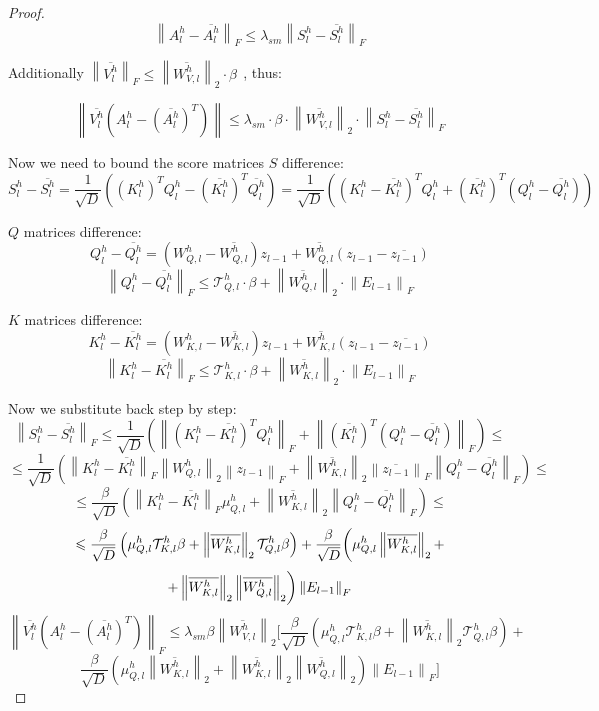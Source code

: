 \documentclass[a4paper,14pt]{extarticle}
\begin{document}
\begin{proof}
        $$\left\|A_l^h - \overline{A_l^h}\right\|_F \leqslant \lambda_{sm} \left\|S_l^h - \overline{S_l^h}\right\|_F $$

        Additionally $\left\|\overline{V_l^h}\right\|_F \leqslant \left\|\overline{W_{V,l}^h}\right\|_2 \cdot \beta ~~$, thus:

        $$\left\|\overline{V_l^h} (A_l^h - (\overline{A_l^h})^T)\right\|\leqslant \lambda_{sm} \cdot \beta \cdot\left\|\overline{W_{V,l}^h}\right\|_2 \cdot \left\|S_l^h - \overline{S_l^h}\right\|_F$$

        Now we need to bound the score matrices $S$ difference:
        $$ S_l^h - \overline{S_l^h} = \frac{1}{\sqrt{D}} ((K_l^h)^T Q_l^h - (\overline{K_l^h})^T \overline{Q_l^h}) = \frac{1}{\sqrt{D}}\left((K_l^h - \overline{K_l^h})^T Q_l^h + (\overline{K_l^h})^T(Q_l^h - \overline{Q_l^h})\right)$$

        $Q$ matrices difference:
         $$Q_l^h - \overline{Q_l^h} = (W_{Q, l}^h - \overline{W_{Q, l}^h}) z_{l-1} + \overline{W_{Q, l}^h} (z_{l-1} - \overline{z_{l-1}})$$
         $$\left\|Q_l^h - \overline{Q_l^h}\right\|_F \leqslant \mathcal{T}_{Q,l}^h \cdot \beta + \left\|\overline{W_{Q,l}^h}\right\|_2 \cdot \left\|E_{l-1}\right\|_F$$

        $K$ matrices difference:
         $$K_l^h - \overline{K_l^h} = (W_{K,l}^h - \overline{W_{K,l}^h}) z_{l-1} + \overline{W_{K,l}^h} (z_{l-1} - \overline{z_{l-1}})$$
         $$\left\|K_l^h - \overline{K_l^h}\right\|_F \leqslant \mathcal{T}_{K,l}^h \cdot \beta + \left\|\overline{W_{K,l}^h}\right\|_2 \cdot \left\|E_{l-1}\right\|_F$$

        Now we substitute back step by step:
        $$\left\|S_l^h - \overline{S_l^h}\right\|_F \leqslant \frac{1}{\sqrt{D}}\left(\left\|(K_l^h - \overline{K_l^h})^T Q_l^h\right\|_F + \left\|(\overline{K_l^h})^T(Q_l^h - \overline{Q_l^h})\right\|_F\right) \leqslant$$
        $$\leqslant \frac{1}{\sqrt{D}}\left(\left\|K_l^h - \overline{K_l^h}\right\|_F \left\|W_{Q,l}^h\right\|_2 \left\|z_{l-1}\right\|_F +  \left\|\overline{W_{K,l}^h}\right\|_2 \left\|\overline{z_{l-1}}\right\|_F \left\|Q_l^h - \overline{Q_l^h}\right\|_F\right) \leqslant $$
        $$\leqslant \frac{\beta}{\sqrt{D}}\left(\left\|K_l^h - \overline{K_l^h}\right\|_F \mu_{Q,l}^h +  \left\|\overline{W_{K,l}^h}\right\|_2  \left\|Q_l^h - \overline{Q_l^h}\right\|_F\right) \leqslant$$
        $$ \leqslant \frac{\beta}{\sqrt{D}}\left(\mu_{Q,l}^h \mathcal{T}_{K,l}^h \beta + \left\|\overline{W_{K,l}^h}\right\|_2 \mathcal{T}_{Q,l}^h \beta \right) + \frac{\beta}{\sqrt{D}}\biggr{(}\mu_{Q,l}^h \left\|\overline{W_{K,l}^h}\right\|_2 + $$
        $$+ \left\|\overline{W_{K,l}^h}\right\|_2 \left\|\overline{W_{Q,l}^h}\right\|_2\biggr{)} \left\|E_{l-1}\right\|_F$$
        $$\left\|\overline{V_l^h} (A_l^h - (\overline{A_l^h})^T)\right\|_F \leqslant \lambda_{sm} \beta \left\|\overline{W_{V,l}^h}\right\|_2 \biggr[ \frac{\beta}{\sqrt{D}}\left(\mu_{Q,l}^h \mathcal{T}_{K,l}^h \beta + \left\|\overline{W_{K,l}^h}\right\|_2 \mathcal{T}_{Q,l}^h \beta \right) + $$
        $$\frac{\beta}{\sqrt{D}}\left(\mu_{Q,l}^h \left\|\overline{W_{K,l}^h}\right\|_2 + \left\|\overline{W_{K,l}^h}\right\|_2 \left\|\overline{W_{Q,l}^h}\right\|_2\right) \left\|E_{l-1}\right\|_F \biggr]$$


\end{proof}
\end{document}
